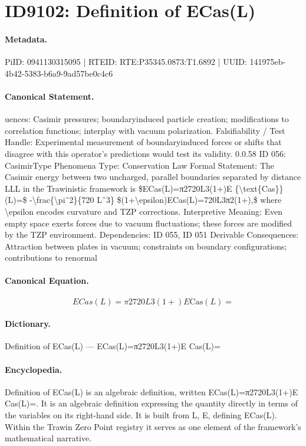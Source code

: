 \section*{ID9102: Definition of ECas(L)}
\paragraph{Metadata.}
PiID: 0941130315095 | RTEID: RTE:P35345.0873:T1.6892 | UUID: 141975eb-4b42-5383-b6a9-9ad57be0c4c6

\paragraph{Canonical Statement.}
uences: Casimir pressures; boundaryinduced particle creation; modifications to correlation functions; interplay with vacuum polarization. Falsifiability / Test Handle: Experimental measurement of boundaryinduced forces or shifts that disagree with this operator’s predictions would test its validity. 0.0.58 ID 056: CasimirType Phenomena Type: Conservation Law Formal Statement: The Casimir energy between two uncharged, parallel boundaries separated by distance LLL in the Trawinistic framework is \$ECas(L)=π2720L3(1+)E \{\textbackslash{}text\{Cas\}\}(L)=\$ -\textbackslash{}frac\{\textbackslash{}piˆ2\}\{720 Lˆ3\} \$(1+\textbackslash{}epsilon)ECas(L)=720L3π2(1+),\$ where \textbackslash{}epsilon encodes curvature and TZP corrections. Interpretive Meaning: Even empty space exerts forces due to vacuum fluctuations; these forces are modified by the TZP environment. Dependencies: ID 055, ID 051 Derivable Consequences: Attraction between plates in vacuum; constraints on boundary configurations; contributions to renormal

\paragraph{Canonical Equation.}
\[
ECas(L)=π2720L3(1+)E {\text{Cas}}(L)=
\]

\paragraph{Dictionary.}
Definition of ECas(L) — ECas(L)=π2720L3(1+)E Cas(L)=

\paragraph{Encyclopedia.}
Definition of ECas(L) is an algebraic definition, written ECas(L)=π2720L3(1+)E Cas(L)=. It is an algebraic definition expressing the quantity directly in terms of the variables on its right-hand side. It is built from L, E, defining ECas(L). Within the Trawin Zero Point registry it serves as one element of the framework's mathematical narrative.
